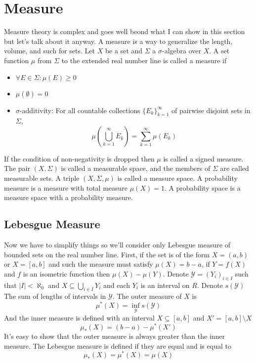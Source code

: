 \documentclass{article}
\begin{document}
\section{Measure}
Measure theory is complex and goes well beond what I can show in this section but let's talk about it anyway. A measure is a way to generalize the length, volume, and such for sets. Let $X$ be a set and $\Sigma$ a $\sigma$-algebra over $X$. A set function $\mu$ from $\Sigma$ to the extended real number line is called a measure if
\begin{itemize}
\item $\forall E\in\Sigma:\mu(E)\ge 0$
\item $\mu(\emptyset)=0$
\item $\sigma$-additivity: For all countable collections $\{E_k\}_{k=1}^\infty$ of pairwise disjoint sets in $\Sigma$,
\[
\mu(\bigcup_{k=1}^\infty{E_k})=\sum_{k=1}^\infty{\mu(E_k)}
\]
\end{itemize}
If the condition of non-negativity is dropped then $\mu$ is called a signed measure. The pair $(X,\Sigma)$ is called a measurable space, and the members of $\Sigma$ are called measurable sets. A triple $(X,\Sigma,\mu)$ is called a measure space. A probability measure is a measure with total measure $\mu(X)=1$. A probability space is a measure space with a probability measure.
\subsection{Lebesgue Measure}
Now we have to simplify things so we'll consider only Lebesgue measure of bounded sets on the real number line. First, if the set is of the form $X=(a,b)$ or $X=[a,b]$ and such the measure must satisfy $\mu(X)=b-a$, if $Y=f(X)$ and $f$ is an isometric function then $\mu(X)-\mu(Y)$. Denote $\mathcal{Y}=(Y_i)_{i\in I}$ such that $|I|<\aleph_0$ and $X\subseteq \bigcup_{i\in I}{Y_i}$ and each $Y_i$ is an interval on $R$. Denote $s(\mathcal{Y})$ The sum of lengths of intervals in $\mathcal{Y}$. The outer measure of $X$ is
\[\mu^*(X) = \inf_{\mathcal{Y}}s(\mathcal{Y})\]
And the inner measure is defined with an interval $X\subseteq[a,b]$ and $X'=[a,b]\setminus X$
\[\mu_*(X) = (b-a)- \mu^*(X')\]
It's easy to show that the outer measure is always greater than the inner measure. The Lebesgue measure is defined if they are equal and is equal to
\[\mu_*(X)=\mu^*(X)=\mu(X)\]


\newpage
\end{document}
